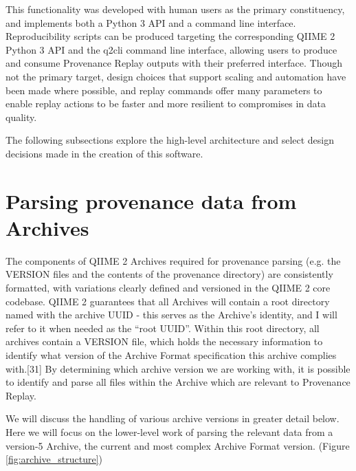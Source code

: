 This functionality was developed with human users as the primary constituency,
and implements both a Python 3 API and a command line interface. Reproducibility
scripts can be produced targeting the corresponding QIIME 2 Python 3 API and the
q2cli command line interface, allowing users to produce and consume Provenance
Replay outputs with their preferred interface. Though not the primary target,
design choices that support scaling and automation have been made where
possible, and replay commands offer many parameters to enable replay actions to
be faster and more resilient to compromises in data quality.

The following subsections explore the high-level architecture and select design
decisions made in the creation of this software.

\section{Parsing provenance data from Archives}

The components of QIIME 2 Archives required for provenance parsing (e.g. the
VERSION files and the contents of the provenance directory) are consistently
formatted, with variations clearly defined and versioned in the QIIME 2 core
codebase. QIIME 2 guarantees that all Archives will contain a root directory
named with the archive UUID - this serves as the Archive’s identity, and I will
refer to it when needed as the “root UUID”. Within this root directory, all
archives contain a VERSION file, which holds the necessary information to
identify what version of the Archive Format specification this archive complies
with.[31] By determining which archive version we are working with, it is
possible to identify and parse all files within the Archive which are relevant
to Provenance Replay.

We will discuss the handling of various archive versions in greater detail
below. Here we will focus on the lower-level work of parsing the relevant data
from a version-5 Archive, the current and most complex Archive Format version.
(Figure \ref{fig:archive_structure})

